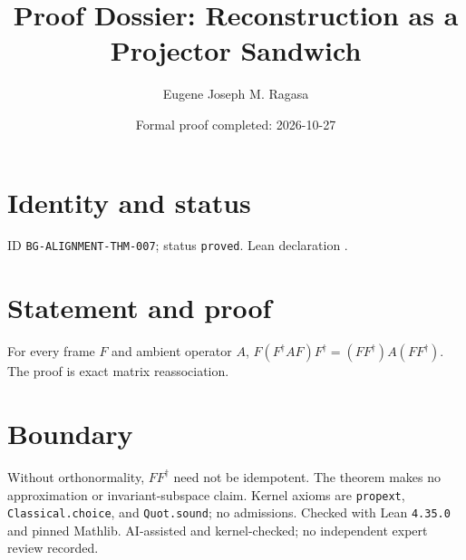 \documentclass[11pt]{article}
\title{Proof Dossier: Reconstruction as a Projector Sandwich}\author{Eugene Joseph M. Ragasa}\date{Formal proof completed: 2026-10-27}
\begin{document}
\maketitle
\section{Identity and status}
ID \texttt{BG-ALIGNMENT-THM-007}; status \texttt{proved}. Lean declaration .
\section{Statement and proof}
For every frame $F$ and ambient operator $A$, $F(F^\dagger A F)F^\dagger=(FF^\dagger)A(FF^\dagger)$. The proof is exact matrix reassociation.
\section{Boundary}
Without orthonormality, $FF^\dagger$ need not be idempotent. The theorem makes no approximation or invariant-subspace claim. Kernel axioms are \texttt{propext}, \texttt{Classical.choice}, and \texttt{Quot.sound}; no admissions. Checked with Lean \texttt{4.35.0} and pinned Mathlib. AI-assisted and kernel-checked; no independent expert review recorded.
\end{document}
